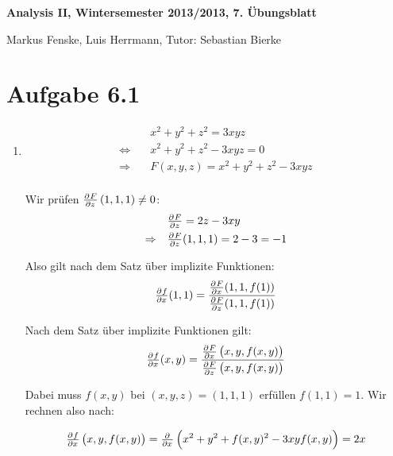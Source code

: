 \documentclass[a4paper,german,12pt,smallheadings]{scrartcl}
\begin{document}
\begin{center}
\bfseries %
\sffamily %
\vspace{-40pt}
Analysis II, Wintersemester 2013/2013, 7. Übungsblatt

Markus Fenske, Luis Herrmann, Tutor: Sebastian Bierke
\vspace{-10pt}
\end{center}
\allowdisplaybreaks %
\section*{Aufgabe 6.1}
\begin{enumerate}[(1)]
  \item
    \begin{align*}
                            &x^2 + y^2 + z^2 = 3xyz \\
      \Leftrightarrow\quad  &x^2 + y^2 + z^2 - 3xyz = 0 \\
      \Rightarrow\quad      &F(x,y,z) = x^2 + y^2 + z^2 - 3xyz \\
    \end{align*}

    Wir prüfen $\pd{F}{z}\del{1,1,1} \neq 0$:
    \begin{align*}
                          &\pd{F}{z} = 2z - 3xy \\
      \Rightarrow\quad    &\pd{F}{z}(1,1,1) = 2-3 = -1
    \end{align*}

    Also gilt nach dem Satz über implizite Funktionen:
    \begin{align*}
      \pd{f}{x}(1,1) = \frac{\pd{F}{x}(1,1,f(1))}{\pd{F}{z}(1,1,f(1))}
    \end{align*}

    Nach dem Satz über implizite Funktionen gilt:
    \begin{align*}
      \pd{f}{x}(x,y) = \frac{\pd{F}{x}\del{x,y,f(x,y)}}{\pd{F}{z}\del{x,y,f(x,y)}}
    \end{align*}

    Dabei muss $f(x,y)$ bei $(x,y,z) = (1,1,1)$ erfüllen $f(1,1) = 1$. Wir rechnen also nach:

    \begin{align*}
      \pd{f}{x}\del{x,y,f(x,y)} = \pd{}{x} \del{x^2 + y^2 + f(x,y)^2 - 3xyf(x,y)} = 2x
    \end{align*}


\end{enumerate}
\end{document}
